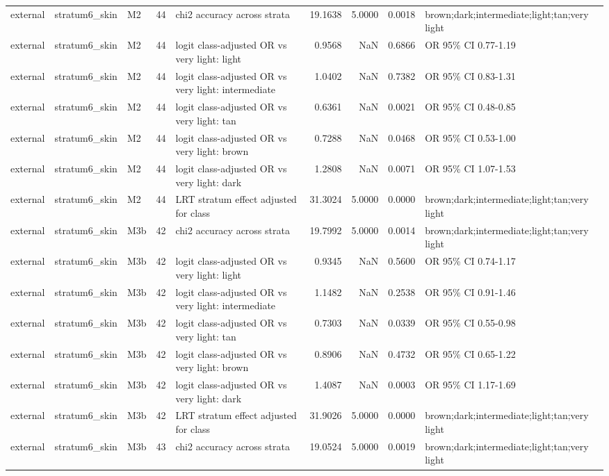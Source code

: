 \begin{tabular}{lllrlrrrl}
external & stratum6\_skin & M2 & 44 & chi2 accuracy across strata & 19.1638 & 5.0000 & 0.0018 & brown;dark;intermediate;light;tan;very light \\
external & stratum6\_skin & M2 & 44 & logit class-adjusted OR vs very light: light & 0.9568 & NaN & 0.6866 & OR 95\% CI 0.77-1.19 \\
external & stratum6\_skin & M2 & 44 & logit class-adjusted OR vs very light: intermediate & 1.0402 & NaN & 0.7382 & OR 95\% CI 0.83-1.31 \\
external & stratum6\_skin & M2 & 44 & logit class-adjusted OR vs very light: tan & 0.6361 & NaN & 0.0021 & OR 95\% CI 0.48-0.85 \\
external & stratum6\_skin & M2 & 44 & logit class-adjusted OR vs very light: brown & 0.7288 & NaN & 0.0468 & OR 95\% CI 0.53-1.00 \\
external & stratum6\_skin & M2 & 44 & logit class-adjusted OR vs very light: dark & 1.2808 & NaN & 0.0071 & OR 95\% CI 1.07-1.53 \\
external & stratum6\_skin & M2 & 44 & LRT stratum effect adjusted for class & 31.3024 & 5.0000 & 0.0000 & brown;dark;intermediate;light;tan;very light \\
external & stratum6\_skin & M3b & 42 & chi2 accuracy across strata & 19.7992 & 5.0000 & 0.0014 & brown;dark;intermediate;light;tan;very light \\
external & stratum6\_skin & M3b & 42 & logit class-adjusted OR vs very light: light & 0.9345 & NaN & 0.5600 & OR 95\% CI 0.74-1.17 \\
external & stratum6\_skin & M3b & 42 & logit class-adjusted OR vs very light: intermediate & 1.1482 & NaN & 0.2538 & OR 95\% CI 0.91-1.46 \\
external & stratum6\_skin & M3b & 42 & logit class-adjusted OR vs very light: tan & 0.7303 & NaN & 0.0339 & OR 95\% CI 0.55-0.98 \\
external & stratum6\_skin & M3b & 42 & logit class-adjusted OR vs very light: brown & 0.8906 & NaN & 0.4732 & OR 95\% CI 0.65-1.22 \\
external & stratum6\_skin & M3b & 42 & logit class-adjusted OR vs very light: dark & 1.4087 & NaN & 0.0003 & OR 95\% CI 1.17-1.69 \\
external & stratum6\_skin & M3b & 42 & LRT stratum effect adjusted for class & 31.9026 & 5.0000 & 0.0000 & brown;dark;intermediate;light;tan;very light \\
external & stratum6\_skin & M3b & 43 & chi2 accuracy across strata & 19.0524 & 5.0000 & 0.0019 & brown;dark;intermediate;light;tan;very light \\

\end{tabular}
